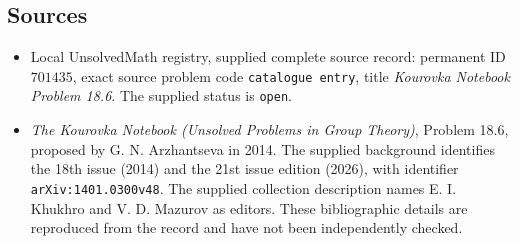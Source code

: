 \documentclass[11pt]{article}
\begin{document}
\subsection{Sources}
\begin{itemize}
\item Local UnsolvedMath registry, supplied complete source record: permanent ID \(701435\), exact source problem code \texttt{catalogue entry}, title \emph{Kourovka Notebook Problem 18.6}. The supplied status is \texttt{open}.
\item \emph{The Kourovka Notebook (Unsolved Problems in Group Theory)}, Problem 18.6, proposed by G. N. Arzhantseva in 2014. The supplied background identifies the 18th issue (2014) and the 21st issue edition (2026), with identifier \texttt{arXiv:1401.0300v48}. The supplied collection description names E. I. Khukhro and V. D. Mazurov as editors. These bibliographic details are reproduced from the record and have not been independently checked.
\end{itemize}
\end{document}
